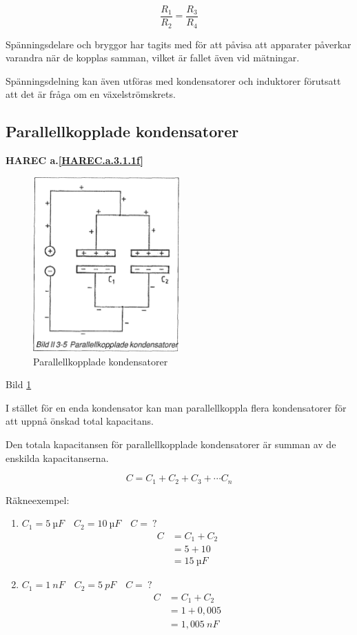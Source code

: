 \[\frac{R_1}{R_2} = \frac{R_3}{R_4}\]

Spänningsdelare och bryggor har tagits med för att påvisa att apparater påverkar
varandra när de kopplas samman, vilket är fallet även vid mätningar.

Spänningsdelning kan även utföras med kondensatorer och induktorer förutsatt att
det är fråga om en växelströmskrets.

\subsection{Parallellkopplade kondensatorer}
\textbf{HAREC a.\ref{HAREC.a.3.1.1f}\label{myHAREC.a.3.1.1f}}

\begin{figure}
\includegraphics[width=0.5\textwidth]{images/bild_2_3-05}
\caption{Parallellkopplade kondensatorer}
\label{fig:BildII3-05}
\end{figure}

Bild \ref{fig:BildII3-05}

I stället för en enda kondensator kan man parallellkoppla flera kondensatorer
för att uppnå önskad total kapacitans.

Den totala kapacitansen för parallellkopplade kondensatorer är summan av de
enskilda kapacitanserna.

\[C = C_1 + C_2 + C_3 + \cdots C_n\]

Räkneexempel:
\begin{enumerate}
\item \(C_1 = 5\ µF \quad C_2 = 10\ µF \quad C =\ ?\)
  \begin{align*}
    C &= C_1 + C_2 \\
    &= 5 + 10 \\
    &= 15\ µF
  \end{align*}
\item \(C_1 = 1\ nF \quad C_2 = 5\ pF \quad C =\ ?\)
  \begin{align*}
    C &= C_1 + C_2 \\
    &= 1 + 0,005 \\
    &= 1,005\ nF
  \end{align*}
\end{enumerate}

